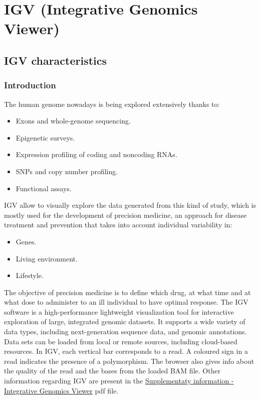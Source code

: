 \graphicspath{{chapters/notes/04/images}}
\chapter{IGV (Integrative Genomics Viewer)} \label{chap: IGV}

\section{IGV characteristics}

    \subsection{Introduction}
    The human genome nowadays is being explored extensively thanks to:

    \begin{multicols}{2}
        \begin{itemize}
            \item Exons and whole-genome sequencing.
            \item Epigenetic surveys.
            \item Expression profiling of coding and noncoding RNAs.
            \item SNPs and copy number profiling.
            \item Functional assays.
        \end{itemize}
    \end{multicols}

    IGV allow to visually explore the data generated from this kind of study, which is mostly used for the development of precision medicine, an approach for disease treatment and prevention that takes into account individual variability in:

    \begin{multicols}{3}
        \begin{itemize}
            \item Genes.
            \item Living environment.
            \item Lifestyle.
        \end{itemize}
    \end{multicols}

    The objective of precision medicine is to define which drug, at what time and at what dose to administer to an ill individual to have optimal response.
    The IGV software is a high-performance lightweight visualization tool for interactive exploration of large, integrated genomic datasets.
    It supports a wide variety of data types, including next-generation sequence data, and genomic annotations.
    Data sets can be loaded from local or remote sources, including cloud-based resources.
    In IGV, each vertical bar corresponds to a read.
    A coloured sign in a read indicates the presence of a polymorphism.
    The browser also gives info about the quality of the read and the bases from the loaded BAM file.
    Other information regarding IGV are present in the \href{https://authors.library.caltech.edu/72234/2/nbt.1754-S1.pdf}{Supplementaty information - Integrative Genomics Viewer} pdf file.

